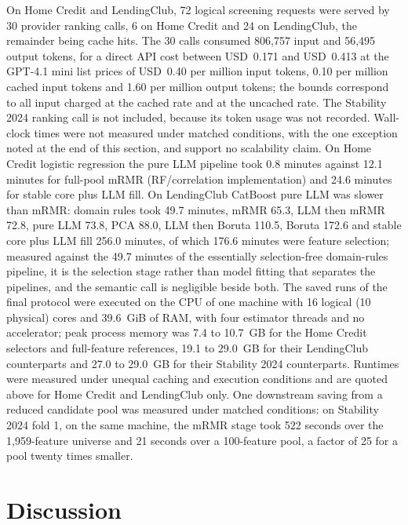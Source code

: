 \documentclass[final,5p,twocolumn]{elsarticle}
\begin{document}
On Home Credit and LendingClub, 72 logical screening requests were served by 30 provider ranking calls, 6 on Home Credit and 24 on LendingClub, the remainder being cache hits. The 30 calls consumed 806,757 input and 56,495 output tokens, for a direct API cost between USD~0.171 and USD~0.413 at the GPT-4.1 mini list prices of USD~0.40 per million input tokens, 0.10 per million cached input tokens and 1.60 per million output tokens; the bounds correspond to all input charged at the cached rate and at the uncached rate. The Stability 2024 ranking call is not included, because its token usage was not recorded. Wall-clock times were not measured under matched conditions, with the one exception noted at the end of this section, and support no scalability claim. On Home Credit logistic regression the pure LLM pipeline took 0.8 minutes against 12.1 minutes for full-pool mRMR (RF/correlation implementation) and 24.6 minutes for stable core plus LLM fill. On LendingClub CatBoost pure LLM was slower than mRMR: domain rules took 49.7 minutes, mRMR 65.3, LLM then mRMR 72.8, pure LLM 73.8, PCA 88.0, LLM then Boruta 110.5, Boruta 172.6 and stable core plus LLM fill 256.0 minutes, of which 176.6 minutes were feature selection; measured against the 49.7 minutes of the essentially selection-free domain-rules pipeline, it is the selection stage rather than model fitting that separates the pipelines, and the semantic call is negligible beside both. The saved runs of the final protocol were executed on the CPU of one machine with 16 logical (10 physical) cores and 39.6~GiB of RAM, with four estimator threads and no accelerator; peak process memory was 7.4 to 10.7~GB for the Home Credit selectors and full-feature references, 19.1 to 29.0~GB for their LendingClub counterparts and 27.0 to 29.0~GB for their Stability 2024 counterparts. Runtimes were measured under unequal caching and execution conditions and are quoted above for Home Credit and LendingClub only. One downstream saving from a reduced candidate pool was measured under matched conditions: on Stability 2024 fold 1, on the same machine, the mRMR stage took 522 seconds over the 1,959-feature universe and 21 seconds over a 100-feature pool, a factor of 25 for a pool twenty times smaller.




\section{Discussion}
\label{sec:discussion}
\end{document}
